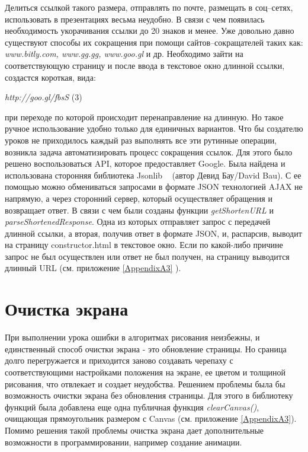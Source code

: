 \vspace{6mm}

Делиться ссылкой такого размера, отправлять по почте, размещать в соц–сетях, использовать в презентациях весьма неудобно. В связи с чем появилась необходимость укорачивания ссылки до 20 знаков и менее. Уже довольно давно существуют способы их сокращения при помощи сайтов–сокращателей таких как:  \textit{www.bitly.com, www.gg.gg, www.goo.gl} и др. Необходимо зайти на соответствующую страницу и после ввода в текстовое окно длинной ссылки, создастся короткая, вида:
 
\begin{center}
\vspace{6mm}
 \textit{ http://goo.gl/fbsS } (3)\par
\end{center}

при переходе по которой происходит перенаправление на длинную. Но такое ручное использование удобно только для единичных вариантов. Что бы создателю уроков не приходилось каждый раз выполнять все эти рутинные операции, возникла задача автоматизировать процесс сокращения ссылок. Для этого было решено воспользоваться API, которое предоставляет Google. Была найдена и использована сторонняя библиотека Jsonlib ~\cite{jsonlib} (автор Девид Бау/David Bau). С ее помощью можно обмениваться запросами в формате JSON технологией AJAX не напрямую, а через сторонний сервер, который осуществляет обращения и возвращает ответ. В связи с чем были созданы функции \textit{getShortenURL} и \textit{parseShortenedResponse}. Одна из которых отправляет запрос с передачей длинной ссылки, а вторая, получив ответ в формате JSON, и, распарсив, выводит на страницу constructor.html в текстовое окно. Если по какой-либо причине запрос не был осуществлен или ответ не был получен, на страницу выводится  длинный URL (см. приложение \ref{AppendixA3} ).



\section{Очистка экрана} \label{sect1_1}

При выполнении урока ошибки в алгоритмах рисования неизбежны, и единственный способ очистки экрана - это обновление страницы. Но сраница долго перегружается и приходится заново создавать черепаху с соответствующими настройками положения на экране, ее цветом и толщиной рисования, что отвлекает и создает неудобства. Решением проблемы была бы возможность очистки экрана без обновления страницы. Для этого в библиотеку функций была добавлена еще одна публичная функция \textit{clearCanvas()}, очищающая прямоугольник размером с Canvas (см. приложение \ref{AppendixA3}). Помимо решения такой проблемы очистка экрана дает дополнительные возможности в программировании, например создание анимации.


